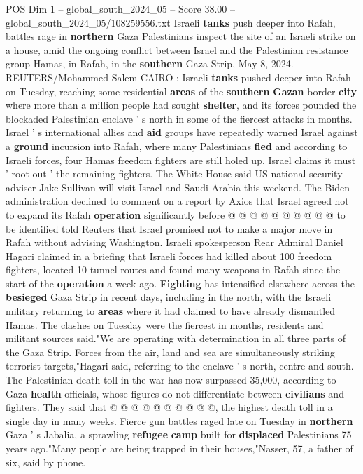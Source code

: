 \begin{textsample}{POS Dim 1 – global\_south\_2024\_05 – Score 38.00 – global\_south\_2024\_05/108259556.txt}  \label{ex:f1_pos_072}
Israeli \textbf{tanks} push deeper into Rafah, battles rage in \textbf{northern} Gaza Palestinians inspect the site of an Israeli strike on a house, amid the ongoing conflict between Israel and the Palestinian resistance group Hamas, in Rafah, in the \textbf{southern} Gaza Strip, May 8, 2024.
REUTERS/Mohammed Salem CAIRO : Israeli \textbf{tanks} pushed deeper into Rafah on Tuesday, reaching some residential \textbf{areas} of the \textbf{southern} \textbf{Gazan} border \textbf{city} where more than a million people had sought \textbf{shelter}, and its forces pounded the blockaded Palestinian enclave ' s north in some of the fiercest attacks in months.
Israel ' s international allies and \textbf{aid} groups have repeatedly warned Israel against a \textbf{ground} incursion into Rafah, where many Palestinians \textbf{fled} and according to Israeli forces, four Hamas freedom fighters are still holed up.
Israel claims it must ' root out ' the remaining fighters.
The White House said US national security adviser Jake Sullivan will visit Israel and Saudi Arabia this weekend.
The Biden administration declined to comment on a report by Axios that Israel agreed not to expand its Rafah \textbf{operation} significantly before @ @ @ @ @ @ @ @ @ @ to be identified told Reuters that Israel promised not to make a major move in Rafah without advising Washington.
Israeli spokesperson Rear Admiral Daniel Hagari claimed in a briefing that Israeli forces had killed about 100 freedom fighters, located 10 tunnel routes and found many weapons in Rafah since the start of the \textbf{operation} a week ago. \textbf{Fighting} has intensified elsewhere across the \textbf{besieged} Gaza Strip in recent days, including in the north, with the Israeli military returning to \textbf{areas} where it had claimed to have already dismantled Hamas.
The clashes on Tuesday were the fiercest in months, residents and militant sources said."We are operating with determination in all three parts of the Gaza Strip.
Forces from the air, land and sea are simultaneously striking terrorist targets,"Hagari said, referring to the enclave ' s north, centre and south.
The Palestinian death toll in the war has now surpassed 35,000, according to Gaza \textbf{health} officials, whose figures do not differentiate between \textbf{civilians} and fighters.
They said that @ @ @ @ @ @ @ @ @ @, the highest death toll in a single day in many weeks.
Fierce gun battles raged late on Tuesday in \textbf{northern} Gaza ' s Jabalia, a sprawling \textbf{refugee} \textbf{camp} built for \textbf{displaced} Palestinians 75 years ago."Many people are being trapped in their houses,"Nasser, 57, a father of six, said by phone.

\end{textsample}
